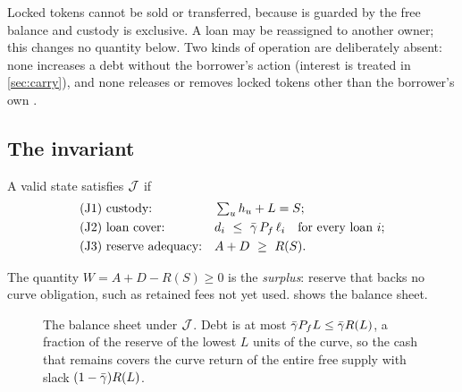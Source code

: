 Locked tokens cannot be sold or transferred, because  is guarded by the free balance and custody is exclusive. A loan may be reassigned to another owner; this changes no quantity below. Two kinds of operation are deliberately absent: none increases a debt without the borrower's action (interest is treated in \cref{sec:carry}), and none releases or removes locked tokens other than the borrower's own .

\subsection{The invariant}

\begin{definition}\label{def:J}
A valid state satisfies $\mathcal{J}$ if
\begin{align}
&\text{(J1) custody:} && \textstyle\sum_u h_u+L=S; \\
&\text{(J2) loan cover:} && d_i\ \le\ \gbar\,\Pf\,\ell_i\quad\text{for every loan } i;\label{eq:J2}\\
&\text{(J3) reserve adequacy:} && A+D\ \ge\ R(S).\label{eq:J3}
\end{align}
\end{definition}

The quantity $W=A+D-R(S)\ge 0$ is the \emph{surplus}: reserve that backs no curve obligation, such as retained fees not yet used.  shows the balance sheet.

\begin{figure}[t]
\centering
{}
\caption{The balance sheet under $\mathcal{J}$. Debt is at most $\bar\gamma P_f L\le\bar\gamma R(L)$, a fraction of the reserve of the lowest $L$ units of the curve, so the cash that remains covers the curve return of the entire free supply with slack $(1-\bar\gamma)R(L)$.}\label{fig:sheet}
\end{figure}

